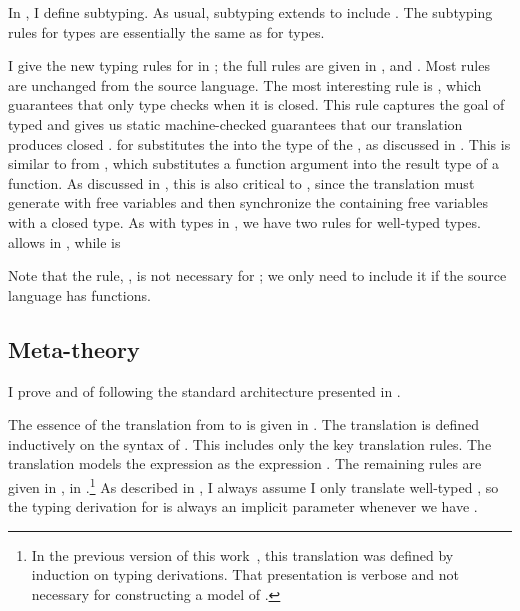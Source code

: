 \FigCCCCSub
In , I define subtyping.
As usual, subtyping extends  to include .
The subtyping rules for  types are essentially the same as for
 types.

\FigCCCCTypingNew[h!]
I give the new typing rules for \tlang in ; the
full rules are given in ,
 and .
Most rules are unchanged from the source language.
The most interesting rule is , which guarantees that 
only type checks when it is closed.
This rule captures the goal of typed  and gives us
static machine-checked guarantees that our translation produces closed
.
 for  \im{\tcloe{\te}{\tepr}} substitutes the
 \im{\tepr} into the type of the , as discussed
in .
This is similar to  from \slang, which
substitutes a function argument into the result type of a function.
As discussed in , this is also critical to , since the translation must generate  
with free variables and then synchronize the  
containing free variables with a closed  type.
As with \im{\sfontsym{\Pi}} types in \slang, we have two rules for well-typed
 types.
 allows  in \im{\tpropty}, while
 is 

Note that the  rule, , is not necessary
for ; we only need to include it if the source language
has  functions.

\subsection{Meta-theory}
\label{sec:abs-cc:consistency}
I prove  and  of \tlang following the
standard architecture presented in .

\FigCCCCModelShort
The essence of the  translation from \tlang to \slang is given in
.
The translation is defined inductively on the syntax of .
This includes only the key translation rules.
The translation \im{\absccmodel{\te} = \se} models the \tlang expression
\im{\te} as the \slang expression \im{\se}.
The remaining rules are given in , in
.\footnote{In the previous version of
  this work~\cite{bowman2018:cccc}, this translation was defined by induction on
  typing derivations.
  That presentation is verbose and not necessary for constructing a model
  of \tlang.}
As described in , I always assume I only translate
well-typed , so the typing derivation for \im{\te} is always
an implicit parameter whenever we have \im{\absccmodel{\te}}.

